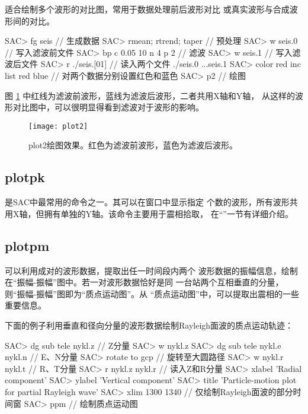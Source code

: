  适合绘制多个波形的对比图，常用于数据处理前后波形对比
或真实波形与合成波形间的对比。
\begin{SACCode}
SAC> fg seis                     // 生成数据
SAC> rmean; rtrend; taper        // 预处理
SAC> w seis.0                    // 写入滤波前文件
SAC> bp c 0.05 10 n 4 p 2        // 滤波
SAC> w seis.1                    // 写入滤波后文件
SAC> r ./seis.[01]               // 读入两个文件
./seis.0 ...seis.1
SAC> color red inc list red blue // 对两个数据分别设置红色和蓝色
SAC> p2                          // 绘图
\end{SACCode}
图 \ref{fig:plot2} 中红线为滤波前波形，蓝线为滤波后波形，二者共用X轴和Y轴，
从这样的波形对比图中，可以很明显得看到滤波对于波形的影响。

\begin{figure}[H]
\centering
\texttt{[image: plot2]}
\caption[plot2绘图效果]{plot2绘图效果。红色为滤波前波形，蓝色为滤波后波形。}
\label{fig:plot2}
\end{figure}

\subsection{plotpk}
 是SAC中最常用的命令之一。其可以在窗口中显示指定
个数的波形，所有波形共用X轴，但拥有单独的Y轴。该命令主要用于震相拾取，
在``''一节有详细介绍。

\subsection{plotpm}
 可以利用成对的波形数据，提取出任一时间段内两个
波形数据的振幅信息，绘制在``振幅-振幅''图中。若一对波形数据恰好是同
一台站两个互相垂直的分量，则``振幅-振幅''图即为``质点运动图''。从
``质点运动图''中，可以提取出震相的一些重要信息。

下面的例子利用垂直和径向分量的波形数据绘制Rayleigh面波的质点运动轨迹：
\begin{SACCode}
SAC> dg sub tele nykl.z             // Z分量
SAC> w nykl.z
SAC> dg sub tele nykl.e nykl.n      // E、N分量
SAC> rotate to gcp                  // 旋转至大圆路径
SAC> w nykl.r nykl.t                // R、T分量
SAC> r nykl.z nykl.r                // 读入Z和R分量
SAC> xlabel 'Radial component'
SAC> ylabel 'Vertical component'
SAC> title 'Particle-motion plot for partial Rayleigh wave'
SAC> xlim 1300 1340                 // 仅绘制Rayleigh面波的部分时间窗
SAC> ppm                            // 绘制质点运动图
\end{SACCode}

